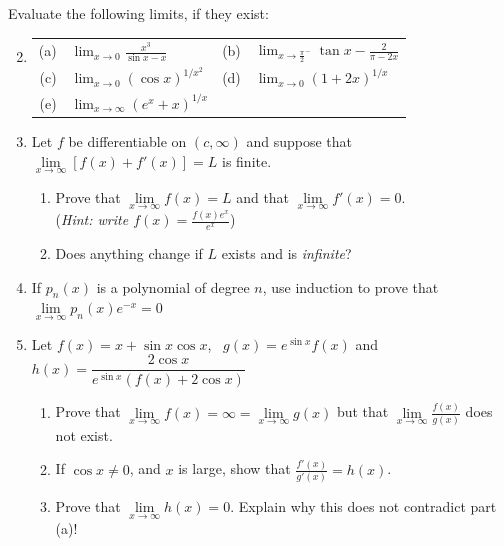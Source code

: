 \begin{exercises}
\exstart Evaluate the following limits, if they exist:\vspace{-5pt}
\begin{enumerate}\setcounter{enumi}{1}
  \item[]\renewcommand{\arraystretch}{1.5}
  \begin{tabular}{r@{\ \ }l@{\qquad}r@{\ \ }l}
  (a)
  &
  $\displaystyle\lim_{x\to 0}\frac{x^3}{\sin x-x}$
  &
  (b)
  &
  $\displaystyle\lim_{x\to {\frac\pi 2}^-}\tan x-\frac 2{\pi-2x}$
  \\
  (c)
  &
  $\displaystyle\lim_{x\to 0}(\cos x)^{1/x^2}$
	&
	(d)
	&
	$\displaystyle\lim_{x\to 0}(1+2x)^{1/x}$
	\\
	(e)
	&
	$\displaystyle\lim_{x\to \infty}(e^x+x)^{1/x}$
  &
  \end{tabular}
  	
	\item Let $f$ be differentiable on $(c,\infty)$ and suppose that $\lim\limits_{x\to\infty}[f(x)+f'(x)]=L$ is finite.
	\begin{enumerate}
	  \item Prove that $\lim\limits_{x\to\infty}f(x)=L$ and that $\lim\limits_{x\to\infty}f'(x)=0$.\\
		(\emph{Hint: write $f(x)=\frac{f(x)e^x}{e^x}$})
		\item Does anything change if $L$ exists and is \emph{infinite}?
	\end{enumerate}
	
	\item\label{exs:pnexplimit} If $p_n(x)$ is a polynomial of degree $n$, use induction to prove that $\lim\limits_{x\to\infty}p_n(x)e^{-x}=0$
	
	\item Let $f(x)=x+\sin x\cos x$, \ $g(x)=e^{\sin x}f(x)$ and $h(x)=\dfrac{2\cos x}{e^{\sin x}(f(x)+2\cos x)}$
	\begin{enumerate}
	  \item Prove that $\lim\limits_{x\to\infty}f(x)=\infty=\lim\limits_{x\to\infty}g(x)$ but that $\lim\limits_{x\to\infty}\frac{f(x)}{g(x)}$ does not exist.
	  \item If $\cos x\neq 0$, and $x$ is large, show that $\frac{f'(x)}{g'(x)}=h(x)$.
	  \item Prove that $\lim\limits_{x\to\infty}h(x)=0$. Explain why this does not contradict part (a)!
	\end{enumerate}
\end{enumerate}
\end{exercises}
\clearpage


